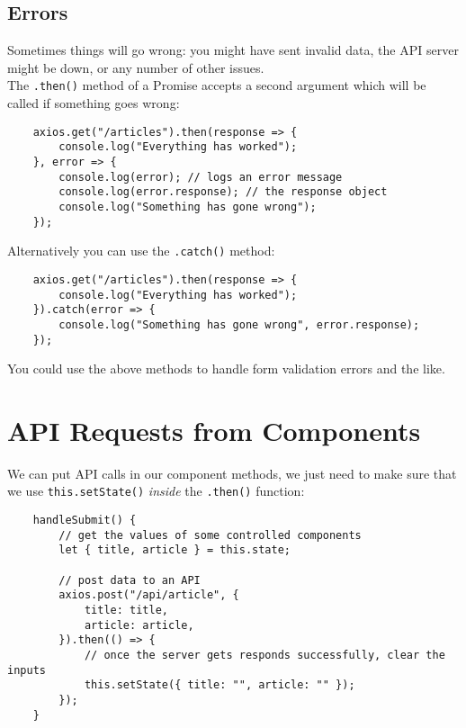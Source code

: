 \subsection{Errors}

Sometimes things will go wrong: you might have sent invalid data, the API server might be down, or any number of other issues.
\\

The \texttt{.then()} method of a Promise accepts a second argument which will be called if something goes wrong:

\begin{verbatim}
    axios.get("/articles").then(response => {
        console.log("Everything has worked");
    }, error => {
        console.log(error); // logs an error message
        console.log(error.response); // the response object
        console.log("Something has gone wrong");
    });
\end{verbatim}

Alternatively you can use the \texttt{.catch()} method:

\begin{verbatim}
    axios.get("/articles").then(response => {
        console.log("Everything has worked");
    }).catch(error => {
        console.log("Something has gone wrong", error.response);
    });
\end{verbatim}

You could use the above methods to handle form validation errors and the like.

\section{API Requests from Components}

We can put API calls in our component methods, we just need to make sure that we use \texttt{this.setState()} \textit{inside} the \texttt{.then()} function:

\begin{verbatim}
    handleSubmit() {
        // get the values of some controlled components
        let { title, article } = this.state;

        // post data to an API
        axios.post("/api/article", {
            title: title,
            article: article,
        }).then(() => {
            // once the server gets responds successfully, clear the inputs
            this.setState({ title: "", article: "" });
        });
    }
\end{verbatim}

